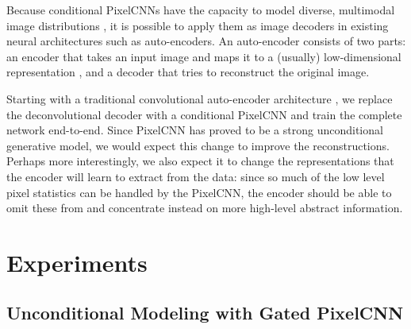 \documentclass{article}
\begin{document}
Because conditional PixelCNNs have the capacity to model diverse, multimodal image distributions , it is possible to apply them as image decoders in existing neural architectures such as auto-encoders. An auto-encoder consists of two parts: an encoder that takes an input image  and maps it to a (usually) low-dimensional representation , and a decoder that tries to reconstruct the original image.

Starting with a traditional convolutional auto-encoder architecture \cite{masci2011stacked}, we replace the deconvolutional decoder with a conditional PixelCNN and train the complete network end-to-end.
Since PixelCNN has proved to be a strong unconditional generative model, we would expect this change to improve the reconstructions.
Perhaps more interestingly, we also expect it to change the representations that the encoder will learn to extract from the data: since so much of the low level pixel statistics can be handled by the PixelCNN, the encoder should be able to omit these from  and concentrate instead on more high-level abstract information.
 \section{Experiments}

\subsection{Unconditional Modeling with Gated PixelCNN}
\end{document}
